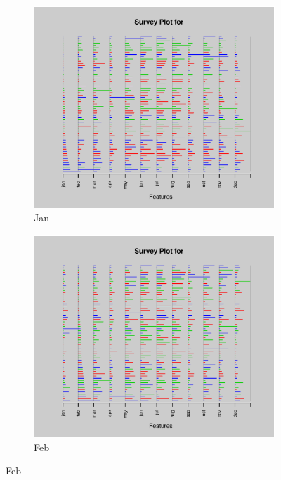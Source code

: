 \documentclass{article}
\begin{document}
\begin{enumerate}[leftmargin = 0 em, label = \arabic*., font = \bfseries]
\begin{enumerate}
\begin{enumerate}
        \begin{figure}[!htb]
            \centering
        	\begin{subfigure}[b]{0.3\textwidth}
        	\includegraphics[width = \textwidth]{3cii1.eps}
        	\caption{Jan}
        	\end{subfigure}%
        	\begin{subfigure}[b]{0.3\textwidth}
        	\includegraphics[width = \textwidth]{3cii2.eps}
        	\caption{Feb}
        	\end{subfigure}%

\end{figure}
\end{enumerate}
\end{enumerate}
\end{enumerate}
\end{document}
